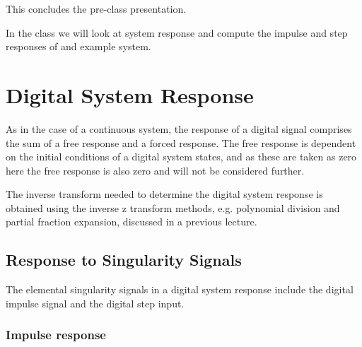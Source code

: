 \ifslidesonly
\begin{slide}
This concludes the pre-class presentation.

In the class we will
look at system response and compute the impulse and step responses of
and example system.
\end{slide}
\fi


\section*{Digital System Response}

As in the case of a continuous system, the response of a digital
signal comprises the sum of a free response and a forced response.
The free response is dependent on the initial conditions of a
digital system states, and as these are taken as zero here the
free response is also zero and will not be considered further.

\ifslidesonly
\begin{slide}\label{slide:l9s5} 

\end{slide}
\fi


The inverse transform needed to determine the digital system
response is obtained using the inverse z transform methods, e.g.
polynomial division and partial fraction expansion, discussed in a
previous lecture.

\subsection*{Response to Singularity Signals}

The elemental singularity signals in a digital system response
include the digital impulse signal and the digital step input.

\subsubsection*{Impulse response}

\ifslidesonly
\begin{slide}\label{slide:l9s6} 

\end{slide}
\fi


